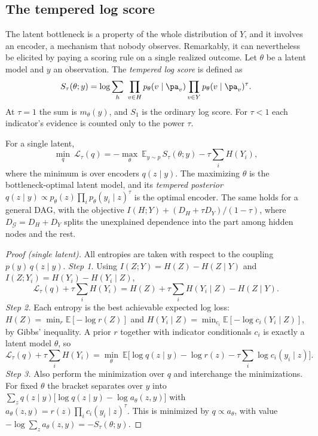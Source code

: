 \begin{draftblock}
\subsection{The tempered log score}

The latent bottleneck is a property of the whole distribution of $Y$, and it involves an encoder, a mechanism that nobody observes. Remarkably, it can nevertheless be elicited by paying a scoring rule on a single realized outcome. Let $\theta$ be a latent model and $y$ an observation. The \emph{tempered log score} is defined as
\begin{equation}\label{arb:eq:stau}
S_\tau(\theta;y)=\log\sum_h\ \prod_{v\in H}p_\theta(v\mid\pa_v)\prod_{v\in Y}p_\theta(v\mid\pa_v)^{\tau}.
\end{equation}
At $\tau=1$ the sum is $m_\theta(y)$, and $S_1$ is the ordinary log score. For $\tau<1$ each indicator's evidence is counted only to the power $\tau$.

\begin{theorem}\label{arb:thm:stau}
For a single latent,
\[
\min_q\ \mathcal L_\tau(q)=-\max_\theta\ \mathbb E_{y\sim p}\,S_\tau(\theta;y)-\tau\sum_iH(Y_i),
\]
where the minimum is over encoders $q(z\mid y)$. The maximizing $\theta$ is the bottleneck-optimal latent model, and its \emph{tempered posterior} $q(z\mid y)\propto p_\theta(z)\prod_ip_\theta(y_i\mid z)^\tau$ is the optimal encoder. The same holds for a general DAG, with the objective $I(H;Y)+(D_H+\tau D_Y)/(1-\tau)$, where $D_{\mathcal G}=D_H+D_Y$ splits the unexplained dependence into the part among hidden nodes and the rest.
\end{theorem}

\begin{proof}[Proof (single latent)]
All entropies are taken with respect to the coupling $p(y)\,q(z\mid y)$.
\emph{Step 1.} Using $I(Z;Y)=H(Z)-H(Z\mid Y)$ and $I(Z;Y_i)=H(Y_i)-H(Y_i\mid Z)$,
\[
\mathcal L_\tau(q)+\tau\textstyle\sum_iH(Y_i)=H(Z)+\tau\sum_iH(Y_i\mid Z)-H(Z\mid Y).
\]
\emph{Step 2.} Each entropy is the best achievable expected log loss: $H(Z)=\min_r\mathbb E[-\log r(Z)]$ and $H(Y_i\mid Z)=\min_{c_i}\mathbb E[-\log c_i(Y_i\mid Z)]$, by Gibbs' inequality. A prior $r$ together with indicator conditionals $c_i$ is exactly a latent model $\theta$, so
\[
\mathcal L_\tau(q)+\tau\textstyle\sum_iH(Y_i)=\min_\theta\ \mathbb E\Big[\log q(z\mid y)-\log r(z)-\tau\sum_i\log c_i(y_i\mid z)\Big].
\]
\emph{Step 3.} Also perform the minimization over $q$ and interchange the minimizations. For fixed $\theta$ the bracket separates over $y$ into $\sum_zq(z\mid y)\big[\log q(z\mid y)-\log a_\theta(z,y)\big]$ with $a_\theta(z,y)=r(z)\prod_ic_i(y_i\mid z)^\tau$. This is minimized by $q\propto a_\theta$, with value $-\log\sum_za_\theta(z,y)=-S_\tau(\theta;y)$.
\end{proof}


\end{draftblock}
